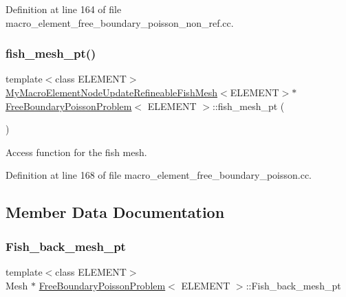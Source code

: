 Definition at line 164 of file macro\+\_\+element\+\_\+free\+\_\+boundary\+\_\+poisson\+\_\+non\+\_\+ref.\+cc.

\mbox{\label{classFreeBoundaryPoissonProblem_adccab51afed9228783120934b6be37c9}} 
\subsubsection{\texorpdfstring{fish\+\_\+mesh\+\_\+pt()}{fish\_mesh\_pt()}\hspace{0.1cm}{\footnotesize\ttfamily [2/2]}}
{\footnotesize\ttfamily template$<$class E\+L\+E\+M\+E\+NT$>$ \\
\hyperlink{classMyMacroElementNodeUpdateRefineableFishMesh}{My\+Macro\+Element\+Node\+Update\+Refineable\+Fish\+Mesh}$<$E\+L\+E\+M\+E\+NT$>$$\ast$ \hyperlink{classFreeBoundaryPoissonProblem}{Free\+Boundary\+Poisson\+Problem}$<$ E\+L\+E\+M\+E\+NT $>$\+::fish\+\_\+mesh\+\_\+pt (\begin{DoxyParamCaption}{ }\end{DoxyParamCaption})\hspace{0.3cm}{\ttfamily [inline]}}



Access function for the fish mesh. 



Definition at line 168 of file macro\+\_\+element\+\_\+free\+\_\+boundary\+\_\+poisson.\+cc.



\subsection{Member Data Documentation}
\mbox{\label{classFreeBoundaryPoissonProblem_aaa45902e79f963060b4b6820c5383cfc}} 
\subsubsection{\texorpdfstring{Fish\+\_\+back\+\_\+mesh\+\_\+pt}{Fish\_back\_mesh\_pt}}
{\footnotesize\ttfamily template$<$class E\+L\+E\+M\+E\+NT$>$ \\
Mesh $\ast$ \hyperlink{classFreeBoundaryPoissonProblem}{Free\+Boundary\+Poisson\+Problem}$<$ E\+L\+E\+M\+E\+NT $>$\+::Fish\+\_\+back\+\_\+mesh\+\_\+pt\hspace{0.3cm}{\ttfamily [private]}}


